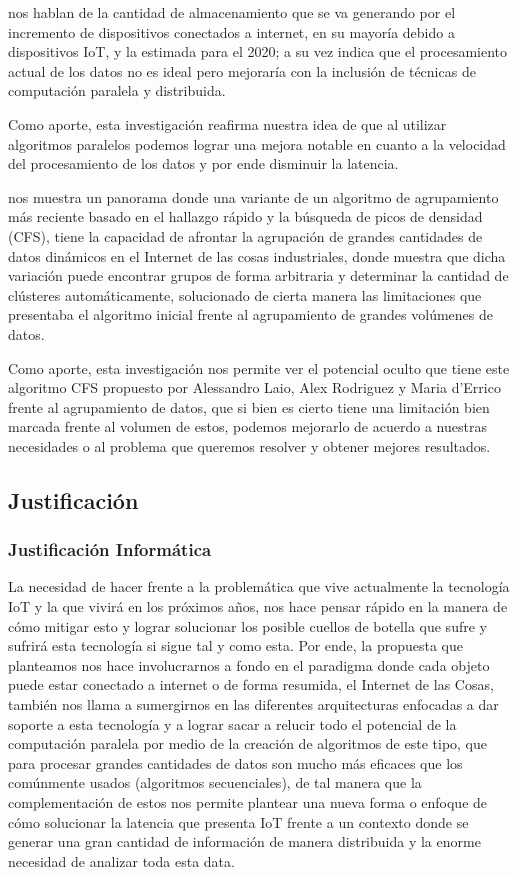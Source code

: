         \vskip 0.3cm
        {\bf\cite{piccialli2018}} nos hablan de la cantidad de almacenamiento que se va generando por el incremento de dispositivos conectados a internet, en su mayoría debido a dispositivos IoT, y la estimada para el 2020; a su vez indica que el procesamiento actual de los datos no es ideal pero mejoraría con la inclusión de técnicas de computación paralela y distribuida.\par
        Como aporte, esta investigación reafirma nuestra idea de que al utilizar algoritmos paralelos podemos lograr una mejora notable en cuanto a la velocidad del procesamiento de los datos y por ende disminuir la latencia. \par
        \vskip 0.3cm
        {\bf\cite{shanmugapriya2018}} nos muestra un panorama donde una variante de un algoritmo de agrupamiento más reciente basado en el hallazgo rápido y la búsqueda de picos de densidad (CFS), tiene la capacidad de afrontar la agrupación de grandes cantidades de datos dinámicos en el Internet de las cosas industriales, donde muestra que dicha variación puede encontrar grupos de forma arbitraria y determinar la cantidad de clústeres automáticamente, solucionado de cierta manera las limitaciones que presentaba el algoritmo inicial frente al agrupamiento de grandes volúmenes de datos.\par
        Como aporte, esta investigación nos permite ver el potencial oculto que tiene este algoritmo CFS propuesto por Alessandro Laio, Alex Rodriguez y Maria d’Errico frente al agrupamiento de datos, que si bien es cierto tiene una limitación bien marcada frente al volumen de estos, podemos mejorarlo de acuerdo a nuestras necesidades o al problema que queremos resolver y obtener mejores resultados.\par

    \subsection{Justificación}
        \subsubsection{Justificación Informática}
            La necesidad de hacer frente a la problemática que vive actualmente la tecnología IoT y la que vivirá en los próximos años, nos hace pensar rápido en la manera de cómo mitigar esto y lograr solucionar los posible cuellos de botella que sufre y sufrirá esta tecnología si sigue tal y como esta. Por ende, la propuesta que planteamos nos hace involucrarnos a fondo en el paradigma donde cada objeto puede estar conectado a internet o de forma resumida, el Internet de las Cosas, también nos llama a sumergirnos en las diferentes arquitecturas enfocadas a dar soporte a esta tecnología y a lograr sacar a relucir todo el potencial de la computación paralela por medio de la creación de algoritmos de este tipo, que para procesar grandes cantidades de datos son mucho más eficaces que los comúnmente usados (algoritmos secuenciales), de tal manera que la complementación de estos nos permite plantear una nueva forma o enfoque de cómo solucionar la latencia que presenta IoT frente a un contexto donde se generar una gran cantidad de información de manera distribuida y la enorme necesidad de analizar toda esta data.
